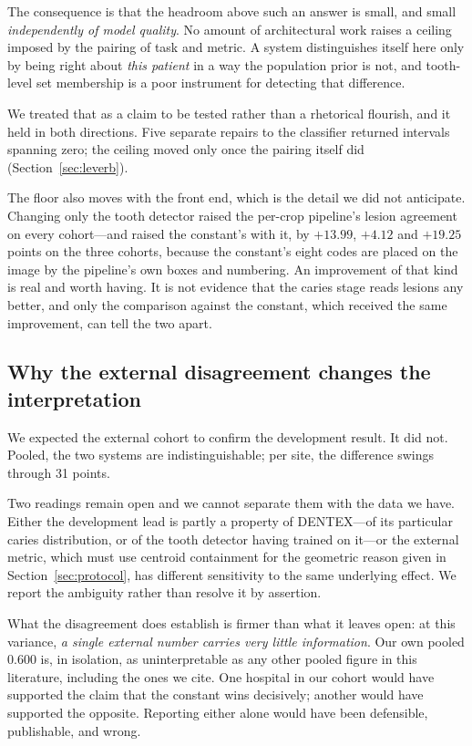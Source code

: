 \documentclass[conference]{IEEEtran}
\begin{document}
The consequence is that the headroom above such an answer is small, and small
\emph{independently of model quality}. No amount of architectural work raises a
ceiling imposed by the pairing of task and metric. A system distinguishes itself
here only by being right about \emph{this patient} in a way the population prior
is not, and tooth-level set membership is a poor instrument for detecting that
difference.

We treated that as a claim to be tested rather than a rhetorical flourish, and it
held in both directions. Five separate repairs to the classifier returned intervals
spanning zero; the ceiling moved only once the pairing itself did
(Section~\ref{sec:leverb}).

The floor also moves with the front end, which is the detail we did not
anticipate. Changing only the tooth detector raised the per-crop pipeline's
lesion agreement on every cohort---and raised the constant's with it, by $+13.99$,
$+4.12$ and $+19.25$ points on the three cohorts, because the constant's eight
codes are placed on the image by the pipeline's own boxes and numbering. An
improvement of that kind is real and worth having. It is not evidence that the
caries stage reads lesions any better, and only the comparison against the
constant, which received the same improvement, can tell the two apart.

\subsection{Why the external disagreement changes the interpretation}
We expected the external cohort to confirm the development result. It did not.
Pooled, the two systems are indistinguishable; per site, the difference swings
through 31 points.

Two readings remain open and we cannot separate them with the data we have.
Either the development lead is partly a property of DENTEX---of its particular
caries distribution, or of the tooth detector having trained on it---or the
external metric, which must use centroid containment for the geometric reason
given in Section~\ref{sec:protocol}, has different sensitivity to the same
underlying effect. We report the ambiguity rather than resolve it by assertion.

What the disagreement does establish is firmer than what it leaves open: at this
variance, \emph{a single external number carries very little information}. Our
own pooled 0.600 is, in isolation, as uninterpretable as any other pooled figure
in this literature, including the ones we cite. One hospital in our cohort would
have supported the claim that the constant wins decisively; another would have
supported the opposite. Reporting either alone would have been defensible,
publishable, and wrong.
\end{document}
